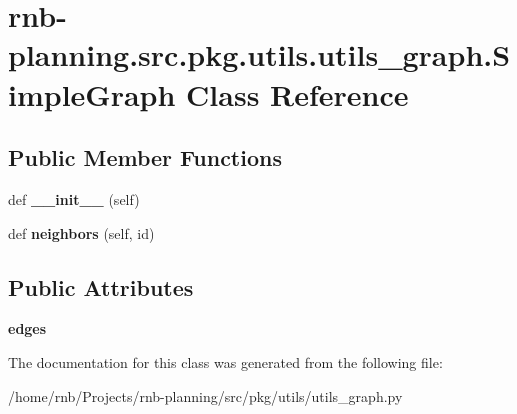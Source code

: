\hypertarget{classrnb-planning_1_1src_1_1pkg_1_1utils_1_1utils__graph_1_1_simple_graph}{}\section{rnb-\/planning.src.\+pkg.\+utils.\+utils\+\_\+graph.\+Simple\+Graph Class Reference}
\label{classrnb-planning_1_1src_1_1pkg_1_1utils_1_1utils__graph_1_1_simple_graph}
\subsection*{Public Member Functions}
\begin{DoxyCompactItemize}
\item 
\mbox{\label{classrnb-planning_1_1src_1_1pkg_1_1utils_1_1utils__graph_1_1_simple_graph_a9f0e10e7c903e3d32b3d81d2ca4d0397}} 
def {\bfseries \+\_\+\+\_\+init\+\_\+\+\_\+} (self)
\item 
\mbox{\label{classrnb-planning_1_1src_1_1pkg_1_1utils_1_1utils__graph_1_1_simple_graph_ac34e7781a59694a4067d0e2d413dced2}} 
def {\bfseries neighbors} (self, id)
\end{DoxyCompactItemize}
\subsection*{Public Attributes}
\begin{DoxyCompactItemize}
\item 
\mbox{\label{classrnb-planning_1_1src_1_1pkg_1_1utils_1_1utils__graph_1_1_simple_graph_ad966862a1a518542eb37712559961899}} 
{\bfseries edges}
\end{DoxyCompactItemize}


The documentation for this class was generated from the following file\+:\begin{DoxyCompactItemize}
\item 
/home/rnb/\+Projects/rnb-\/planning/src/pkg/utils/utils\+\_\+graph.\+py\end{DoxyCompactItemize}
